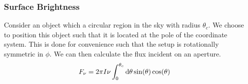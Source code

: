 \subsubsection{Surface Brightness}
Consider an object which a circular region in the sky with radius $\theta_c$.
 We choose to position this object such that it is located at the pole of the coordinate system.
 This is done for convenience such that the setup is rotationally symmetric in $\phi$.
 We can then calculate the flux incident on an aperture.
%
\begin{align}
	F_\nu &= 2\pi I\nu \int_{0}^{\theta_c}\mathop{}\!\mathrm{d}\theta \sin(\theta) \cos(\theta)
\end{align}

 
 
 
 
 
 
 
 
 
 
 
 